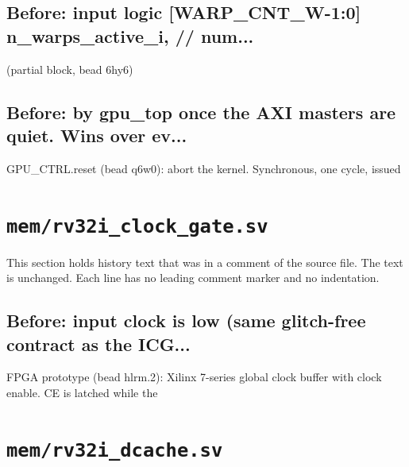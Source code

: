 \begin{record}

\subsection*{Before: input  logic [WARP\_CNT\_W-1:0]   n\_warps\_active\_i, // num...}

\begin{textblock}
(partial block, bead 6hy6)
\end{textblock}

\subsection*{Before: by gpu\_top once the AXI masters are quiet.  Wins over ev...}

\begin{textblock}
GPU_CTRL.reset (bead q6w0): abort the kernel.  Synchronous, one cycle, issued
\end{textblock}

\end{record}

\section{\texttt{mem/rv32i\_clock\_gate.sv}}\label{cr:mod:rv32i-clock-gate}

This section holds history text that was in a comment of the source file. The text is unchanged. Each line has no leading comment marker and no indentation.

\begin{record}

\subsection*{Before: input clock is low (same glitch-free contract as the ICG...}

\begin{textblock}
FPGA prototype (bead hlrm.2): Xilinx 7-series global clock buffer with clock enable. CE is latched while the
\end{textblock}

\end{record}

\section{\texttt{mem/rv32i\_dcache.sv}}\label{cr:mod:rv32i-dcache}

